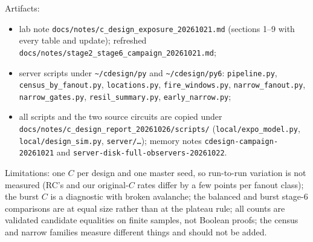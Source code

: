 \documentclass[11pt]{article}
\newcommand{\code}[1]{\texttt{#1}}
\begin{document}
Artifacts:
\begin{itemize}
\item lab note \code{docs/notes/c\_design\_exposure\_20261021.md} (sections 1--9 with every table and update); refreshed \code{docs/notes/stage2\_stage6\_campaign\_20261021.md};
\item server scripts under \code{\textasciitilde/cdesign/py} and \code{\textasciitilde/cdesign/py6}: \code{pipeline.py}, \code{census\_by\_fanout.py}, \code{locations.py}, \code{fire\_windows.py}, \code{narrow\_fanout.py}, \code{narrow\_gates.py}, \code{resil\_summary.py}, \code{early\_narrow.py};
\item all scripts and the two source circuits are copied under \code{docs/notes/c\_design\_report\_20261026/scripts/} (\code{local/expo\_model.py}, \code{local/design\_sim.py}, \code{server/\ldots}); memory notes \code{cdesign-campaign-20261021} and \code{server-disk-full-observers-20261022}.
\end{itemize}

Limitations: one $C$ per design and one master seed, so run-to-run variation is not measured (RC's and our original-$C$ rates differ by a few points per fanout class); the burst $C$ is a diagnostic with broken avalanche; the balanced and burst stage-6 comparisons are at equal size rather than at the plateau rule; all counts are validated candidate equalities on finite samples, not Boolean proofs; the census and narrow families measure different things and should not be added.
\end{document}
